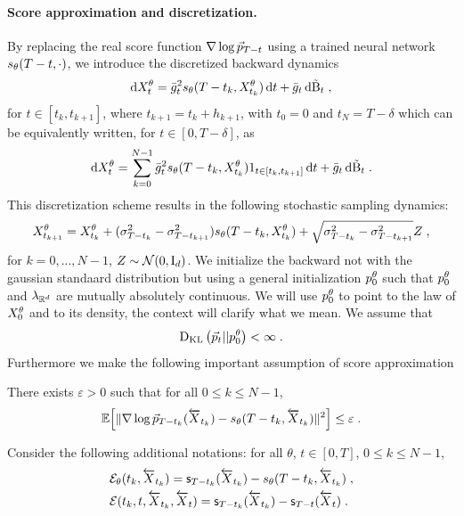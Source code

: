\paragraph{Score approximation and discretization. }
By replacing the real score function $\nabla \log \pforward{T - t}$ using a trained neural network $s_{\param}(T- t,\cdot)$, we
introduce the discretized backward dynamics
\begin{equation}\label{eq:disceq}
\rmd \trainedsolution{t}=  \barg_t^2 \trainedscore{t_k} \, \rmd t + \barg_t \, \rmd\tilde{\brown}_t\eqsp,
\end{equation}
for $t \in [t_k, t_{k+1}]$, where $t_{k+1} = t_k + h_{k+1}$, with $t_0 = 0$ and $t_N = T-\delta$
which can be equivalently written, for  $t \in [0, T - \delta]$, as
\begin{equation}\label{eq:disceq}
\rmd \trainedsolution{t}
    =  \sum_{k=0}^{N-1}\barg_t^2 \trainedscore{t_k} 1_{t \in [t_k, t_{k+1}]} \, \rmd t 
        + \barg_t \, \rmd\tilde{\brown}_t\eqsp.
\end{equation}
This discretization scheme results in the following stochastic sampling dynamics:
\begin{equation}\label{eq:discsolution}
\trainedsolution{t_{k+1}}= \trainedsolution{t_{k}} + (\sigma^2_{T-t_{k}}-\sigma^2_{T-t_{k+1}}) \trainedscore{t_k} + \sqrt{\sigma^2_{T-t_{k}}-\sigma^2_{T-t_{k+1}}}Z \eqsp,
\end{equation}
for $k = 0,...,N-1$, $Z \sim \mathcal{N}(0, \Id_d)$.
We initialize the backward not with the gaussian standaard distribution but using a general initialization $\discsolution[\param]{0}$ such that \(\discsolution{0}\) and $\lambda_{\R^d}$ are mutually absolutely continuous.
We will use $\discsolution[\param]{0}$ to point to the law of $\trainedsolution{0}$ and to its density, the context will clarify what we mean. 
We assume that 
 $$\kl{\pforward{t}}{\discsolution[\param]{0}} <  \infty \eqsp .$$
Furthermore we make the following important assumption of score approximation
\begin{hypH}
\label{assum:train}
There exists $\varepsilon>0$ such that for all $0 \leq k \leq N-1$,
$$
\E \Big[\|\backscore{t_k} - s_{\param}(T-t_k, \back{t_k})\|^2\Big] \leq \varepsilon\eqsp.
$$
\end{hypH}
Consider the following additional notations: for all $\theta$, $t\in[0,T]$, $0\leq k \leq N-1$,
\begin{align}
\label{eq:def:score:err}
&\mathcal{E}_{\theta}(t_k,\back{t_k}) =  \scfc_{T-t_k}(\back{t_k}) - s_\theta(T-t_k,\back{t_k})\eqsp,\\ 
&\mathcal{E}(t_k,t,\back{t_k},\back{t}) = \scfc_{T-t_k}(\back{t_k})  - \scfc_{T-t}(\back{t})\eqsp.\nonumber
\end{align}
